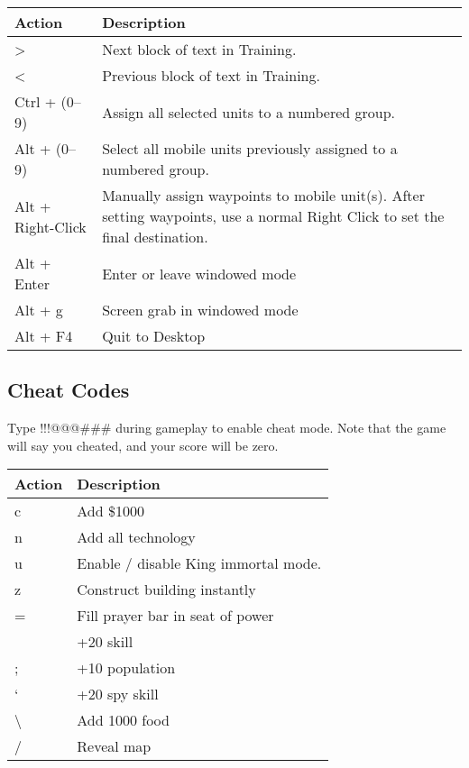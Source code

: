 \begin{center}
	\begin{tabular}{|p{1in}|p{3in}|}
		\hline	 	
		Action	& Description \\ \hline
		\textgreater & Next block of text in Training. \\ \hline
		\textless	& Previous block of text in Training. \\ \hline
		Ctrl + (0--9)	& Assign all selected units to a numbered group. \\ \hline
		Alt + (0--9)	& Select all mobile units previously assigned to a numbered group. \\ \hline
		Alt + Right-Click	& Manually assign waypoints to mobile unit(s). After setting waypoints, use a normal Right Click to set the final destination. \\ \hline
		Alt + Enter & Enter or leave windowed mode \\ \hline
		Alt + g & Screen grab in windowed mode \\ \hline
		Alt + F4	& Quit to Desktop \\ \hline
	\end{tabular}
\end{center}

\subsection{Cheat Codes}

Type !!!@@@\#\#\# during gameplay to enable cheat mode. Note that the game will say you cheated, and your score will be zero.

\begin{center}
	\begin{tabular}{|p{1in}|p{3in}|}
		\hline	 
		Action	& Description \\ \hline
		c	& Add \$1000 \\ \hline
		n	& Add all technology \\ \hline
		u	& Enable / disable King immortal mode. \\ \hline
		z	& Construct building instantly \\ \hline
		=	& Fill prayer bar in seat of power \\ \hline
		[	& +20 combat skill \\ \hline
		]	& +20 skill \\ \hline
		;	& +10 population \\ \hline
		‘	& +20 spy skill \\ \hline
		\textbackslash & Add 1000 food \\ \hline
		/	& Reveal map \\ \hline
	\end{tabular}
\end{center}